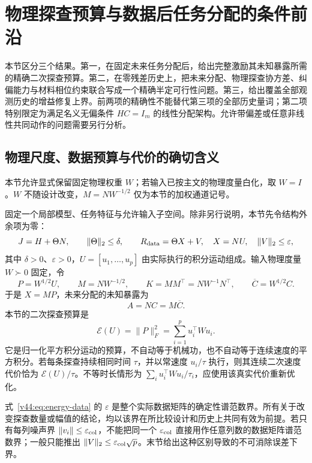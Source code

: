 \documentclass[11pt,a4paper]{article}
\numberwithin{equation}{section}
\theoremstyle{definition}
\begin{document}
\section{物理探查预算与数据后任务分配的条件前沿}
\label{v44:sec:energy-frontier}

本节区分三个结果。第一，在固定未来任务分配后，给出完整激励其未知暴露所需的精确二次探查预算。第二，在零残差历史上，把未来分配、物理探查协方差、纠偏能力与材料相位约束联合写成一个精确半定可行性问题。第三，给出覆盖全部观测历史的增益修复上界。前两项的精确性不能替代第三项的全部历史量词；第二项特别限定为满足名义无偏条件 $HC=I_m$ 的线性分配架构。允许带偏差或任意非线性共同动作的问题需要另行分析。

\subsection{物理尺度、数据预算与代价的确切含义}
本节允许显式保留固定物理权重 $W$；若输入已按主文的物理度量白化，取 $W=I$。$W$ 不随设计改变，$M=NW^{-1/2}$ 仅为本节的加权通道记号。


固定一个局部模型、任务特征与允许输入子空间。除非另行说明，本节先令结构外余项为零：
\begin{equation}
 J=H+\Theta N,\qquad \|\Theta\|_2\le\delta,
 \qquad R_{\rm data}=\Theta X+V,\quad X=NU,
 \quad\|V\|_2\le\varepsilon,
 \label{v44:eq:energy-data}
\end{equation}
其中 $\delta>0$、$\varepsilon>0$，$U=[u_1,\ldots,u_p]$ 由实际执行的积分运动组成。输入物理度量 $W\succ0$ 固定，令
\begin{equation}
 P=W^{1/2}U,\qquad M=NW^{-1/2},\qquad
 K=MM^\top=NW^{-1}N^\top,
 \qquad \overline C=W^{1/2}C.
 \label{v44:eq:probe-whitening}
\end{equation}
于是 $X=MP$，未来分配的未知暴露为
\begin{equation}
 A=NC=M\overline C.
 \label{v44:eq:future-exposure}
\end{equation}
本节的二次探查预算是
\begin{equation}
 \mathcal E(U)=\|P\|_F^2
 =\sum_{i=1}^p u_i^\top W u_i.
 \label{v44:eq:displacement-energy}
\end{equation}
它是归一化平方积分运动的预算，不自动等于机械功，也不自动等于连续速度的平方积分。若每条探查持续相同时间 $\tau$，并以常速度 $u_i/\tau$ 执行，则其连续二次速度代价恰为 $\mathcal E(U)/\tau$。不等时长情形为 $\sum_i u_i^\top W u_i/\tau_i$，应使用该真实代价重新优化。

式~\eqref{v44:eq:energy-data} 的 $\varepsilon$ 是整个实际数据矩阵的确定性谱范数界。所有关于改变探查数量或幅值的结论，均以该界在所比较设计和历史上共同有效为前提。若只有每列噪声界 $\|v_i\|\le\varepsilon_{\rm col}$，不能把同一个 $\varepsilon_{\rm col}$ 直接用作任意列数的数据矩阵谱范数界；一般只能推出 $\|V\|_2\le\varepsilon_{\rm col}\sqrt p$。末节给出这种区别导致的不可消除误差下界。
\end{document}
